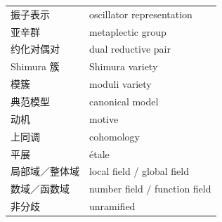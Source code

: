 \begin{longtable}{@{}p{}p{}@{}}
振子表示 & oscillator representation \\
亚辛群 & metaplectic group \\
约化对偶对 & dual reductive pair \\
Shimura 簇 & Shimura variety \\
模簇 & moduli variety \\
典范模型 & canonical model \\
动机 & motive \\
上同调 & cohomology \\
平展 & étale \\
局部域／整体域 & local field / global field \\
数域／函数域 & number field / function field \\
非分歧 & unramified \\
\end{longtable}
